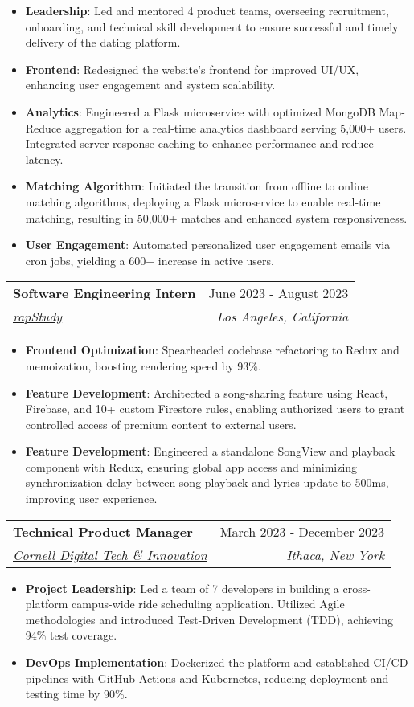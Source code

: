 \documentclass[letterpaper,10pt]{article}
\makeatletter
\newcommand{\resumeItem}[1]{
  \item\small{
    {#1 \vspace{-2.5pt}}
  }
}
\newcommand{\resumeSubheading}[4]{
  \vspace{-3pt}\item
    \begin{tabular*}{0.97\textwidth}[t]{@{}l@{\extracolsep{\fill}}r@{}}
      \textbf{#1} & #2 \\
      \textit{\small#3} & \textit{\small #4} \\
    \end{tabular*}\vspace{-6pt}
}
\newcommand{\resumeItemListStart}{\begin{itemize}}
\newcommand{\resumeItemListEnd}{\end{itemize}\vspace{-1.5pt}}
\makeatother
\begin{document}
\resumeItemListStart
\resumeItem{\textbf{Leadership}: Led and mentored 4 product teams, overseeing recruitment, onboarding, and technical skill development to ensure successful and timely delivery of the dating platform.}
\resumeItem{\textbf{Frontend}: Redesigned the website's frontend for improved UI/UX, enhancing user engagement and system scalability.}
\resumeItem{\textbf{Analytics}: Engineered a Flask microservice with optimized MongoDB Map-Reduce aggregation for a real-time analytics dashboard serving 5,000+ users. Integrated server response caching to enhance performance and reduce latency.}
\resumeItem{\textbf{Matching Algorithm}: Initiated the transition from offline to online matching algorithms, deploying a Flask microservice to enable real-time matching, resulting in 50,000+ matches and enhanced system responsiveness.}
\resumeItem{\textbf{User Engagement}: Automated personalized user engagement emails via cron jobs, yielding a 600+ increase in active users.}
\resumeItemListEnd
\vspace{-12pt}

\resumeSubheading{Software Engineering Intern}{June 2023 - August 2023}{\href{https://rapstudy.com/}{rapStudy}}{Los Angeles, California}
\resumeItemListStart
\resumeItem{\textbf{Frontend Optimization}: Spearheaded codebase refactoring to Redux and memoization, boosting rendering speed by 93\%.}
\resumeItem{\textbf{Feature Development}: Architected a song-sharing feature using React, Firebase, and 10+ custom Firestore rules, enabling authorized users to grant controlled access of premium content to external users.}
\resumeItem{\textbf{Feature Development}: Engineered a standalone SongView and playback component with Redux, ensuring global app access and minimizing synchronization delay between song playback and lyrics update to 500ms, improving user experience.}
\resumeItemListEnd

\resumeSubheading
{Technical Product Manager}{March 2023 - December 2023}
{\href{https://www.cornelldti.org/}{Cornell Digital Tech \& Innovation}}{Ithaca, New York}
\resumeItemListStart
\resumeItem{\textbf{Project Leadership}: Led a team of 7 developers in building a cross-platform campus-wide ride scheduling application. Utilized Agile methodologies and introduced Test-Driven Development (TDD), achieving 94\% test coverage.}
\resumeItem{\textbf{DevOps Implementation}: Dockerized the platform and established CI/CD pipelines with GitHub Actions and Kubernetes, reducing deployment and testing time by 90\%.}
\resumeItemListEnd
\end{document}
